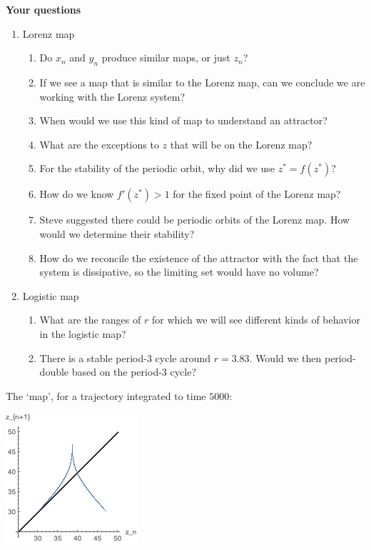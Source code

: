 \documentclass[12pt,letterpaper,noanswers]{exam}
\begin{document}
\noindent\textbf{Your questions}
\begin{enumerate}
    \item Lorenz map
    \begin{enumerate}
        \item Do $x_n$ and $y_n$ produce similar maps, or just $z_n$?
        \item If we see a map that is similar to the Lorenz map, can we conclude we are working with the Lorenz system?
        \item When would we use this kind of map to understand an attractor?
        \item What are the exceptions to $z$ that will be on the Lorenz map?
        \item For the stability of the periodic orbit, why did we use $z^*= f(z^*)$?
        \item How do we know $f'(z^*)>1$ for the fixed point of the Lorenz map?
        \item Steve suggested there could be periodic orbits of the Lorenz map.  How would we determine their stability?
        \item How do we reconcile the existence of the attractor with the fact that the system is dissipative, so the limiting set would have no volume?
    \end{enumerate}
    \item Logistic map
    \begin{enumerate}
        \item What are the ranges of $r$ for which we will see different kinds of behavior in the logistic map?
        \item There is a stable period-3 cycle around $r= 3.83$.  Would we then period-double based on the period-3 cycle?
    \end{enumerate}
\end{enumerate}

The `map', for a trajectory integrated to time $5000$:

\includegraphics{img/191104-C25p1.png}
\end{document}
